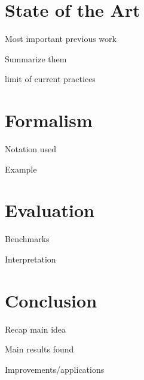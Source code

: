 \documentclass[journal]{IEEEtran}
\begin{document}
\section{State of the Art}

Most important previous work

Summarize them

limit of current practices



\section{Formalism}
Notation used

Example



\section{Evaluation}
Benchmarks

Interpretation



\section{Conclusion}
Recap main idea

Main results found

Improvements/applications

\cite{gollins01}
\cite{peters12}
\cite{savoy09}
\cite{yu09}



\end{document}
